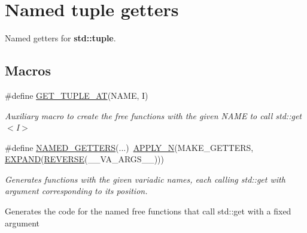 \hypertarget{group__NamedTupleGroupFuncs}{}\section{Named tuple getters}
\label{group__NamedTupleGroupFuncs}


Named getters for {\bf std\+::tuple}.  


\subsection*{Macros}
\begin{DoxyCompactItemize}
\item 
\#define \hyperlink{group__NamedTupleGroupFuncs_ga970484fe66e17af41a99b334e59f01d8}{G\+E\+T\+\_\+\+T\+U\+P\+L\+E\+\_\+\+AT}(N\+A\+ME,  I)
\begin{DoxyCompactList}\small\item\em Auxiliary macro to create the free functions with the given {\ttfamily N\+A\+ME} to call std\+::get$<$\+I$>$ \end{DoxyCompactList}\item 
\#define \hyperlink{group__NamedTupleGroupFuncs_gab747933755549b138c8e86658110db37}{N\+A\+M\+E\+D\+\_\+\+G\+E\+T\+T\+E\+RS}(...)~\hyperlink{Helpers_2Helpers_8h_a48d6b8d510060710e2a730688a4838c6}{A\+P\+P\+L\+Y\+\_\+N}(M\+A\+K\+E\+\_\+\+G\+E\+T\+T\+E\+RS, \hyperlink{ZipIter_2Helpers_8h_aa35fecfa6a93ec3fdb4a3776f873be27}{E\+X\+P\+A\+ND}(\hyperlink{Helpers_2Helpers_8h_ad521206ac9d2802714225a04c48dc442}{R\+E\+V\+E\+R\+SE}(\+\_\+\+\_\+\+V\+A\+\_\+\+A\+R\+G\+S\+\_\+\+\_\+)))
\begin{DoxyCompactList}\small\item\em Generates functions with the given variadic names, each calling std\+::get with argument corresponding to its position. \end{DoxyCompactList}\end{DoxyCompactItemize}
\label{_amgrp01747264fe7bf50731df0522c351974e}%
Generates the code for the named free functions that call std\+::get with a fixed argument

